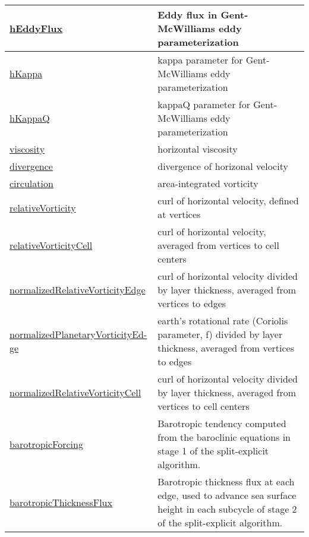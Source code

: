 {\begin{center}
\begin{longtable}{| p{2.0in} | p{4.0in} |}
	\hline
	\hyperref[subsec:var_sec_diagnostics_hEddyFlux]{hEddyFlux} & Eddy flux in Gent-McWilliams eddy parameterization \\
	\hline
	\hyperref[subsec:var_sec_diagnostics_hKappa]{hKappa} & kappa parameter for Gent-McWilliams eddy parameterization \\
	\hline
	\hyperref[subsec:var_sec_diagnostics_hKappaQ]{hKappaQ} & kappaQ parameter for Gent-McWilliams eddy parameterization \\
	\hline
	\hyperref[subsec:var_sec_diagnostics_viscosity]{viscosity} & horizontal viscosity \\
	\hline
	\hyperref[subsec:var_sec_diagnostics_divergence]{divergence} & divergence of horizonal velocity \\
	\hline
	\hyperref[subsec:var_sec_diagnostics_circulation]{circulation} & area-integrated vorticity \\
	\hline
	\hyperref[subsec:var_sec_diagnostics_relativeVorticity]{relativeVorticity} & curl of horizontal velocity, defined at vertices \\
	\hline
	\hyperref[subsec:var_sec_diagnostics_relativeVorticityCell]{relativeVorticityCell} & curl of horizontal velocity, averaged from vertices to cell centers \\
	\hline
	\hyperref[subsec:var_sec_diagnostics_normalizedRelativeVorticityEdge]{normalizedRelativeVorticityEdge} & curl of horizontal velocity divided by layer thickness, averaged from vertices to edges \\
	\hline
	\hyperref[subsec:var_sec_diagnostics_normalizedPlanetaryVorticityEdge]{normalizedPlanetaryVorticityEd-}\hyperref[subsec:var_sec_diagnostics_normalizedPlanetaryVorticityEdge]{ge  }& earth's rotational rate (Coriolis parameter, f) divided by layer thickness, averaged from vertices to edges \\
	\hline
	\hyperref[subsec:var_sec_diagnostics_normalizedRelativeVorticityCell]{normalizedRelativeVorticityCell} & curl of horizontal velocity divided by layer thickness, averaged from vertices to cell centers \\
	\hline
	\hyperref[subsec:var_sec_diagnostics_barotropicForcing]{barotropicForcing} & Barotropic tendency computed from the baroclinic equations in stage 1 of the split-explicit algorithm. \\
	\hline
	\hyperref[subsec:var_sec_diagnostics_barotropicThicknessFlux]{barotropicThicknessFlux} & Barotropic thickness flux at each edge, used to advance sea surface height in each subcycle of stage 2 of the split-explicit algorithm. \\

\end{longtable}
\end{center}}
